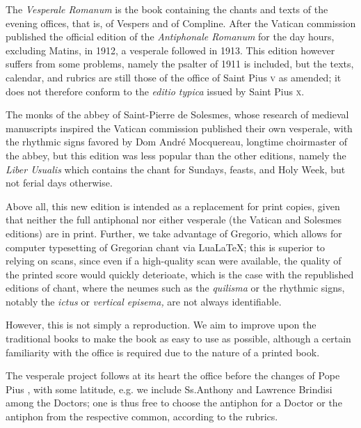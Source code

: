 

\begin{enpars}
The \textit{Vesperale Romanum} is the book containing the chants and texts of the evening offices, that is, of Vespers and of Compline. After the Vatican commission published the official edition of the \textit{Antiphonale Romanum} for the day hours, excluding Matins, in 1912, a vesperale followed in 1913. This edition however suffers from some problems, namely the psalter of 1911 is included, but the texts, calendar, and rubrics are still those of the office of Saint Pius \textsc{v} as amended; it does not therefore conform to the \textit{editio typica} issued by Saint Pius \textsc{x}.

The monks of the abbey of Saint-Pierre de Solesmes, whose research of medieval manuscripts inspired the Vatican commission published their own vesperale, with the rhythmic signs favored by Dom André Mocquereau, longtime choirmaster of the abbey, but this edition was less popular than the other editions, namely the \textit{Liber Usualis} which contains the chant for Sundays, feasts, and Holy Week, but not ferial days otherwise.


Above all, this new edition is intended as a replacement for print copies, given that neither the full antiphonal nor either vesperale (the Vatican and Solesmes editions) are in print. Further, we take advantage of Gregorio, which allows for computer typesetting of Gregorian chant via LuaLaTeX; this is superior to relying on scans, since even if a high-quality scan were available, the quality of the printed score would quickly deterioate, which is the case with the republished editions of chant, where the neumes such as the \textit{quilisma} or the rhythmic signs, notably the \textit{ictus} or \textit{vertical episema,} are not always identifiable.

However, this is not simply a reproduction. We aim to improve upon the traditional books to make the book as easy to use as possible, although a certain familiarity with the office is required due to the nature of a printed book.


The vesperale project follows at its heart the office before the changes of Pope Pius , with some latitude, e.g. we include Ss.\@ Anthony and Lawrence Brindisi among the Doctors; one is thus free to choose the antiphon for a Doctor or the antiphon from the respective common, according to the rubrics.


\end{enpars}
